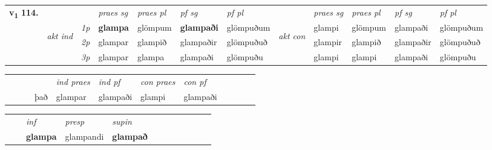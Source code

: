 \begin{tabular}{llllllllllll} \toprule
\multirow{4}{*}{{{\textbf{v{\textsubscript{1}}} \Large{\textbf{114.}}}}}  & &   &  \textit{praes sg}  & \textit{praes pl}  &\textit{ pf sg} & \textit{pf pl} &  &  \textit{praes sg}  & \textit{praes pl}  & \textit{pf sg} & \textit{pf pl } \\*
	\cmidrule{4-7} \cmidrule{9-12}
 & \multirow{3}{*}{\begin{turn}{90}\textit{akt ind}\end{turn}} & {\textit{1p}} & \textbf{glampa} & glömpum    & \textbf{glampaði} & glömpuðum & \multirow{3}{*}{\begin{turn}{90}\textit{akt con}\end{turn}} &glampi & glömpum & glampaði & glömpuðum\\*
& &  {\textit{2p}} &  glampar  & glampið   & glampaðir & glömpuðuð & & glampir & glampið & glampaðir & glömpuðuð \\*
& &  {\textit{3p}} & glampar & glampa   & glampaði & glömpuðu & & glampi & glampi& glampaði & glömpuðu  \\*
\cmidrule{4-7} \cmidrule{9-12}
\end{tabular}


\begin{tabular}{llllllllllll}
 & &  & &  \textit{ind praes} & \textit{ind pf} & \textit{con praes} & \textit{con pf} \\*
&  & & það & glampar & glampaði & glampi & glampaði \\*
\cmidrule{5-9}
\end{tabular}


\begin{tabular}{llllllllllll}
 & & \textit{inf}     & \textit{presp} & \textit{supin}       \\*
  & & \textbf{glampa}      & glampandi &  \textbf{glampað}   \\*
\cmidrule{1-12}
\end{tabular}



